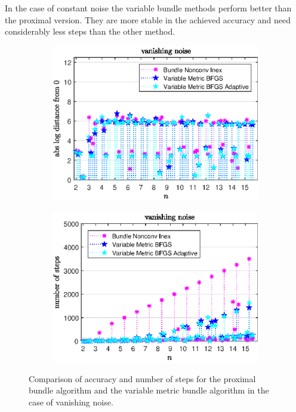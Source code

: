 In the case of constant noise the variable bundle methods perform better than the proximal version. They are more stable in the achieved accuracy and need considerably less steps than the other method.

\begin{figure}[ht]
	\begin{subfigure}{0.49\textwidth}
		\includegraphics[width=\textwidth]{Pictures/Plots/vanishing_noise.eps}%
	\end{subfigure}%
	\hfill
	\begin{subfigure}{0.49\textwidth}
		\includegraphics[width=\textwidth]{Pictures/Plots/steps_vanishing_noise.eps}%
	\end{subfigure}
	\caption[Accuracy and number of steps: vanishing noise]{Comparison of accuracy and number of steps for the proximal bundle algorithm and the variable metric bundle algorithm in the case of vanishing noise.}%
	\label{fig_van_noise}%
\end{figure}

